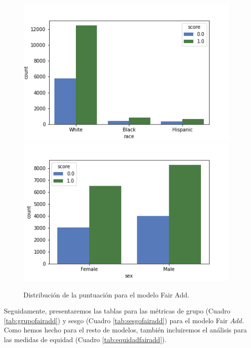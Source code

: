 \documentclass[oneside,openright,titlepage,numbers=noenddot,openany,headinclude,footinclude=true,
cleardoublepage=empty,abstractoff,BCOR=5mm,paper=a4,fontsize=12pt,main=spanish]{scrreprt}
\begin{document}
\begin{figure}[h]
      \includegraphics[width=\linewidth]{images/score_fair_add_race_law.png}
    \endminipage\hfill
      \includegraphics[width=\linewidth]{images/score_fair_add_sex_law.png}
    \endminipage
     \caption{Distribución de la puntuación para el modelo Fair Add.}
     \label{fig:scorefairadd}
\end{figure}

Seguidamente, presentaremos las tablas para las métricas de grupo (Cuadro \ref{tab:grupofairadd}) y sesgo (Cuadro \ref{tab:sesgofairadd}) para el modelo Fair $Add$. Como hemos hecho para el resto de modelos, también incluiremos el análisis para las medidas de equidad (Cuadro \ref{tab:equidadfairadd}).\\
\end{document}

